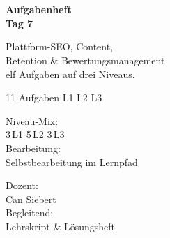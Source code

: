 \documentclass[11pt,a4paper,oneside]{article}
\begin{document}
\begin{titlepage}
  \pagestyle{empty}
  \vspace*{1.5cm}
  \\[2pt]
  \noindent{\color{lpAccent}\rule{\linewidth}{1.2pt}}\\[4pt]

  \vspace{3cm}
  {\sffamily\fontsize{30}{34}\selectfont\bfseries\color{lpInk}Aufgabenheft\\Tag 7\par}

  \vspace{0.7cm}
  {\sffamily\large\color{lpGray}Plattform-SEO, Content,\\Retention \& Bewertungsmanagement\\\textendash{} elf Aufgaben auf drei Niveaus.\par}

  \vspace{1.5cm}
  {\caveatfont\LARGE\color{lpAmber}11 Aufgaben \textperiodcentered{} L1 \textperiodcentered{} L2 \textperiodcentered{} L3}\par

  \vfill

  \noindent\begin{minipage}{0.55\linewidth}
    {\sffamily\footnotesize\color{lpGray}Niveau-Mix:}\\
    {\sffamily\small\color{lpInk}3\,\textsf{L1} \textperiodcentered{} 5\,\textsf{L2} \textperiodcentered{} 3\,\textsf{L3}}\\[10pt]
    {\sffamily\footnotesize\color{lpGray}Bearbeitung:}\\
    {\sffamily\small\color{lpInk}Selbstbearbeitung im Lernpfad}
  \end{minipage}\hfill
  \begin{minipage}{0.4\linewidth}
    \raggedleft
    {\sffamily\footnotesize\color{lpGray}Dozent:}\\
    {\sffamily\small\color{lpInk}Can Siebert}\\[10pt]
    {\sffamily\footnotesize\color{lpGray}Begleitend:}\\
    {\sffamily\small\color{lpInk}Lehrskript \& Lösungsheft}
  \end{minipage}

  \vspace{0.5cm}
  \noindent{\color{lpAccent}\rule{\linewidth}{0.6pt}}
\end{titlepage}
\end{document}
